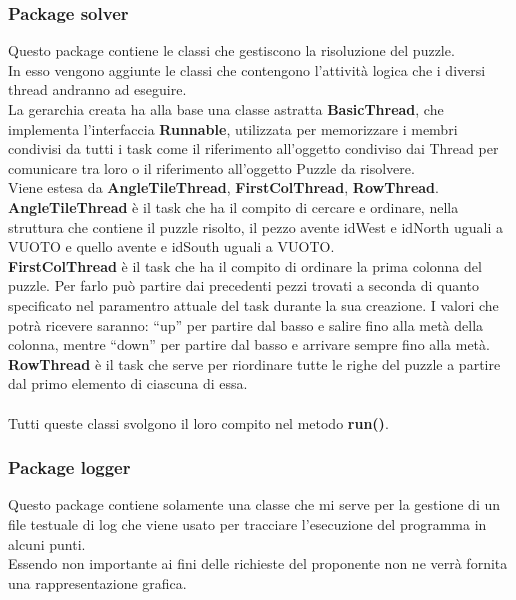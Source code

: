 		\subsubsection{Package solver} %
		\label{ssub:package_solver_2}
		Questo package contiene le classi che gestiscono la risoluzione del puzzle. \\
		In esso vengono aggiunte le classi che contengono l'attività logica che i diversi thread andranno ad eseguire. \\
		La gerarchia creata ha alla base una classe astratta \textbf{BasicThread}, che implementa l'interfaccia \textbf{Runnable}, utilizzata per memorizzare i membri condivisi da tutti i task come il riferimento all'oggetto condiviso dai Thread per comunicare tra loro o il riferimento all'oggetto Puzzle da risolvere. \\
		Viene estesa da \textbf{AngleTileThread}, \textbf{FirstColThread}, \textbf{RowThread}. \\
		\textbf{AngleTileThread} è il task che ha il compito di cercare e ordinare, nella struttura che contiene il puzzle risolto, il pezzo avente idWest e idNorth uguali a VUOTO e quello avente e idSouth uguali a VUOTO. \\
		\textbf{FirstColThread} è il task che ha il compito di ordinare la prima colonna del puzzle. Per farlo può partire dai precedenti pezzi trovati a seconda di quanto specificato nel paramentro attuale del task durante la sua creazione. I valori che potrà ricevere saranno: ``up'' per partire dal basso e salire fino alla metà della colonna, mentre ``down'' per partire dal basso e arrivare sempre fino alla metà. \\
		\textbf{RowThread} è il task che serve per riordinare tutte le righe del puzzle a partire dal primo elemento di ciascuna di essa. \\
		\\
		Tutti queste classi svolgono il loro compito nel metodo \textbf{run()}.
		
		\subsubsection{Package logger} %
		\label{ssub:package_logger}
		Questo package contiene solamente una classe che mi serve per la gestione di un file testuale di log che viene usato per tracciare l'esecuzione del programma in alcuni punti. \\
		Essendo non importante ai fini delle richieste del proponente non ne verrà fornita una rappresentazione grafica.
		
